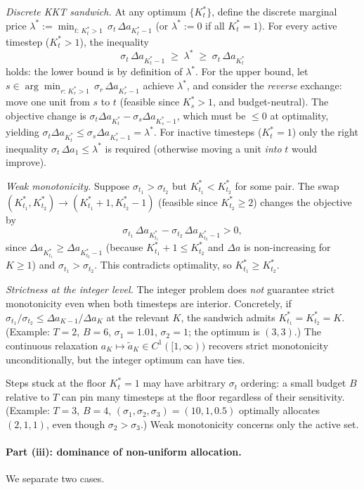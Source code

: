 \emph{Discrete KKT sandwich.} At any optimum $\{K_t^*\}$, define the discrete marginal price $\lambda^* := \min_{t:\,K_t^* > 1}\,\sigma_t\,\Delta a_{K_t^* - 1}$ (or $\lambda^* := 0$ if all $K_t^* = 1$). For every active timestep ($K_t^* > 1$), the inequality
\[
  \sigma_t\,\Delta a_{K_t^* - 1} \;\ge\; \lambda^* \;\ge\; \sigma_t\,\Delta a_{K_t^*}
\]
holds: the lower bound is by definition of $\lambda^*$. For the upper bound, let $s \in \arg\min_{r:\,K_r^* > 1}\,\sigma_r\,\Delta a_{K_r^*-1}$ achieve $\lambda^*$, and consider the \emph{reverse} exchange: move one unit from $s$ to $t$ (feasible since $K_s^* > 1$, and budget-neutral). The objective change is $\sigma_t \Delta a_{K_t^*} - \sigma_s \Delta a_{K_s^* - 1}$, which must be $\le 0$ at optimality, yielding $\sigma_t \Delta a_{K_t^*} \le \sigma_s \Delta a_{K_s^*-1} = \lambda^*$. For inactive timesteps ($K_t^* = 1$) only the right inequality $\sigma_t\,\Delta a_1 \le \lambda^*$ is required (otherwise moving a unit \emph{into} $t$ would improve).

\emph{Weak monotonicity.} Suppose $\sigma_{t_1} > \sigma_{t_2}$ but $K_{t_1}^* < K_{t_2}^*$ for some pair. The swap $(K_{t_1}^*, K_{t_2}^*) \to (K_{t_1}^* + 1, K_{t_2}^* - 1)$ (feasible since $K_{t_2}^* \ge 2$) changes the objective by
\[
  \sigma_{t_1}\,\Delta a_{K_{t_1}^*} - \sigma_{t_2}\,\Delta a_{K_{t_2}^* - 1} > 0,
\]
since $\Delta a_{K_{t_1}^*} \ge \Delta a_{K_{t_2}^* - 1}$ (because $K_{t_1}^* + 1 \le K_{t_2}^*$ and $\Delta a$ is non-increasing for $K \ge 1$) and $\sigma_{t_1} > \sigma_{t_2}$. This contradicts optimality, so $K_{t_1}^* \ge K_{t_2}^*$.

\emph{Strictness at the integer level.} The integer problem does \emph{not} guarantee strict monotonicity even when both timesteps are interior. Concretely, if $\sigma_{t_1}/\sigma_{t_2} \le \Delta a_{K-1}/\Delta a_K$ at the relevant $K$, the sandwich admits $K_{t_1}^* = K_{t_2}^* = K$. (Example: $T=2$, $B=6$, $\sigma_1=1.01$, $\sigma_2=1$; the optimum is $(3, 3)$.) The continuous relaxation $a_K \mapsto \tilde a_K \in C^1([1,\infty))$ recovers strict monotonicity unconditionally, but the integer optimum can have ties.

Steps stuck at the floor $K_t^* = 1$ may have arbitrary $\sigma_t$ ordering: a small budget $B$ relative to $T$ can pin many timesteps at the floor regardless of their sensitivity. (Example: $T = 3$, $B = 4$, $(\sigma_1, \sigma_2, \sigma_3) = (10, 1, 0.5)$ optimally allocates $(2, 1, 1)$, even though $\sigma_2 > \sigma_3$.) Weak monotonicity concerns only the active set.
%
\paragraph{Part (iii): dominance of non-uniform allocation.}
We separate two cases.

